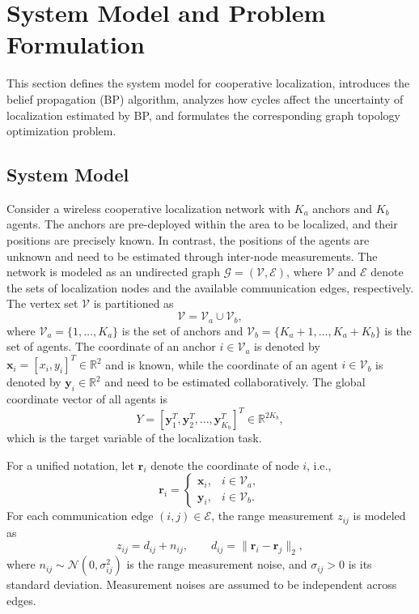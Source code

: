 
\section{System Model and Problem Formulation}
\label{sec:system_formulation}
This section defines the system model for cooperative localization, introduces the belief propagation (BP) algorithm, analyzes how cycles affect the uncertainty of localization estimated by BP, and formulates the corresponding graph topology optimization problem.


\subsection{System Model}
\label{sec:system_model}
Consider a wireless cooperative localization network with $K_a$ anchors and $K_b$ agents. The anchors are pre-deployed within the area to be localized, and their positions are precisely known. In contrast, the positions of the agents are unknown and need to be estimated through inter-node measurements. The network is modeled as an undirected graph $\mathcal{G}=(\mathcal{V},\mathcal{E})$, where $\mathcal{V}$ and $\mathcal{E}$ denote the sets of localization nodes and the available communication edges, respectively. The vertex set $\mathcal{V}$ is partitioned as
\[
    \mathcal{V}=\mathcal{V}_a\cup\mathcal{V}_b,
\]
where $\mathcal{V}_a=\{1,\ldots,K_a\}$ is the set of anchors and $\mathcal{V}_b=\{K_a+1,\ldots,K_a+K_b\}$ is the set of agents. The coordinate of an anchor $i\in \mathcal{V}_a$ is denoted by $\mathbf{x}_i=[x_i,y_i]^T\in \mathbb{R}^2$ and is known, while the coordinate of an agent $i\in \mathcal{V}_b$ is denoted by $\mathbf{y}_i\in \mathbb{R}^2$ and need to be estimated collaboratively. The global coordinate vector of all agents is
\[
    Y=[\mathbf{y}_1^T,\mathbf{y}_2^T,\ldots,\mathbf{y}_{K_b}^T]^T\in \mathbb{R}^{2K_b},
\]
which is the target variable of the localization task.

For a unified notation, let $\mathbf{r}_i$ denote the coordinate of node $i$, i.e.,
\[
    \mathbf{r}_i=
    \begin{cases}
        \mathbf{x}_i, & i\in\mathcal{V}_a,\\
        \mathbf{y}_i, & i\in\mathcal{V}_b.
    \end{cases}
\]
For each communication edge $(i,j)\in\mathcal{E}$, the range measurement $z_{ij}$ is modeled as
\begin{equation}
    z_{ij}=d_{ij}+n_{ij},
    \qquad
    d_{ij}=\|\mathbf{r}_i-\mathbf{r}_j\|_2,
    \label{eq:measurement_model}
\end{equation}
where $n_{ij}\sim\mathcal{N}(0,\sigma_{ij}^2)$ is the range measurement noise, and $\sigma_{ij}>0$ is its standard deviation. Measurement noises are assumed to be independent across edges.

